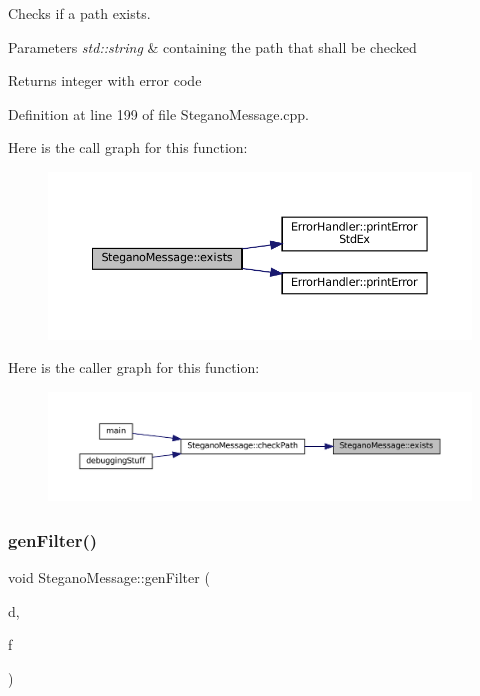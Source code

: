 Checks if a path exists. 


\begin{DoxyParams}{Parameters}
{\em std\+::string} & containing the path that shall be checked \\
\hline
\end{DoxyParams}
\begin{DoxyReturn}{Returns}
integer with error code 
\end{DoxyReturn}


Definition at line 199 of file Stegano\+Message.\+cpp.

Here is the call graph for this function\+:\nopagebreak
\begin{figure}[H]
\begin{center}
\leavevmode
\includegraphics[width=350pt]{classSteganoMessage_acc5a49a35b46d8bf4c40cca8b8c5a52b_cgraph}
\end{center}
\end{figure}
Here is the caller graph for this function\+:\nopagebreak
\begin{figure}[H]
\begin{center}
\leavevmode
\includegraphics[width=350pt]{classSteganoMessage_acc5a49a35b46d8bf4c40cca8b8c5a52b_icgraph}
\end{center}
\end{figure}
\mbox{\label{classSteganoMessage_a1cb326688e9a054127396d198bd6f976}} 
\subsubsection{\texorpdfstring{genFilter()}{genFilter()}}
{\footnotesize\ttfamily void Stegano\+Message\+::gen\+Filter (\begin{DoxyParamCaption}\item[{std\+::vector$<$ std\+::vector$<$ uint32\+\_\+t $>$$>$ $\ast$}]{d,  }\item[{uint32\+\_\+t($\ast$)(uint32\+\_\+t, size\+\_\+t)}]{f }\end{DoxyParamCaption})\hspace{0.3cm}{\ttfamily [private]}}



